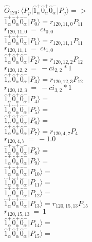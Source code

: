 \documentclass[14pt]{article}
\begin{document}
    $\hat{O}_{120}:  \langle{P_p}\vert \hat{1}_{\alpha}^{+}\hat{0}_{\alpha}^{+}\hat{0}_{\alpha}^{-} \vert{P_q}\rangle => $ \\ 
    $ \hat{1}_{\alpha}^{+}\hat{0}_{\alpha}^{+}\hat{0}_{\alpha}^{-} \vert{P_{0}}\rangle = {r}_{120,11,0}P_{11} $ \\ 
    ${r}_{120,11,0}\ =\ {ci}_{0,0} $ \\ 
    $ \hat{1}_{\alpha}^{+}\hat{0}_{\alpha}^{+}\hat{0}_{\alpha}^{-} \vert{P_{1}}\rangle = {r}_{120,11,1}P_{11} $ \\ 
    ${r}_{120,11,1}\ =\ {ci}_{1,0} $ \\ 
    $ \hat{1}_{\alpha}^{+}\hat{0}_{\alpha}^{+}\hat{0}_{\alpha}^{-} \vert{P_{2}}\rangle = {r}_{120,12,2}P_{12} $ \\ 
    ${r}_{120,12,2}\ =\ -{ci}_{2,2}*1 $ \\ 
    $ \hat{1}_{\alpha}^{+}\hat{0}_{\alpha}^{+}\hat{0}_{\alpha}^{-} \vert{P_{3}}\rangle = {r}_{120,12,3}P_{12} $ \\ 
    ${r}_{120,12,3}\ =\ -{ci}_{3,2}*1 $ \\ 
    $ \hat{1}_{\alpha}^{+}\hat{0}_{\alpha}^{+}\hat{0}_{\alpha}^{-} \vert{P_{4}}\rangle =  $ \\ 
    $ \hat{1}_{\alpha}^{+}\hat{0}_{\alpha}^{+}\hat{0}_{\alpha}^{-} \vert{P_{5}}\rangle =  $ \\ 
    $ \hat{1}_{\alpha}^{+}\hat{0}_{\alpha}^{+}\hat{0}_{\alpha}^{-} \vert{P_{6}}\rangle =  $ \\ 
    $ \hat{1}_{\alpha}^{+}\hat{0}_{\alpha}^{+}\hat{0}_{\alpha}^{-} \vert{P_{7}}\rangle = {r}_{120,4,7}P_{4} $ \\ 
    ${r}_{120,4,7}\ =\ -1.0 $ \\ 
    $ \hat{1}_{\alpha}^{+}\hat{0}_{\alpha}^{+}\hat{0}_{\alpha}^{-} \vert{P_{8}}\rangle =  $ \\ 
    $ \hat{1}_{\alpha}^{+}\hat{0}_{\alpha}^{+}\hat{0}_{\alpha}^{-} \vert{P_{9}}\rangle =  $ \\ 
    $ \hat{1}_{\alpha}^{+}\hat{0}_{\alpha}^{+}\hat{0}_{\alpha}^{-} \vert{P_{10}}\rangle =  $ \\ 
    $ \hat{1}_{\alpha}^{+}\hat{0}_{\alpha}^{+}\hat{0}_{\alpha}^{-} \vert{P_{11}}\rangle =  $ \\ 
    $ \hat{1}_{\alpha}^{+}\hat{0}_{\alpha}^{+}\hat{0}_{\alpha}^{-} \vert{P_{12}}\rangle =  $ \\ 
    $ \hat{1}_{\alpha}^{+}\hat{0}_{\alpha}^{+}\hat{0}_{\alpha}^{-} \vert{P_{13}}\rangle = {r}_{120,15,13}P_{15} $ \\ 
    ${r}_{120,15,13}\ =\ 1 $ \\ 
    $ \hat{1}_{\alpha}^{+}\hat{0}_{\alpha}^{+}\hat{0}_{\alpha}^{-} \vert{P_{14}}\rangle =  $ \\ 
    $ \hat{1}_{\alpha}^{+}\hat{0}_{\alpha}^{+}\hat{0}_{\alpha}^{-} \vert{P_{15}}\rangle =  $ \\ 
    
\end{document}
